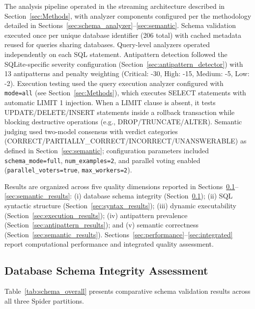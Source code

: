 \documentclass[]{einformatica}
\begin{document}
The analysis pipeline operated in the streaming architecture described in Section~\ref{sec:Methods}, with analyzer components configured per the methodology detailed in Sections~\ref{sec:schema_analyzer}--\ref{sec:semantic}. Schema validation executed once per unique database identifier (206 total) with cached metadata reused for queries sharing databases. Query-level analyzers operated independently on each SQL statement. Antipattern detection followed the SQLite-specific severity configuration (Section~\ref{sec:antipattern_detector}) with 13 antipatterns and penalty weighting (Critical: -30, High: -15, Medium: -5, Low: -2). Execution testing used the query execution analyzer configured with \texttt{mode=all} (see Section~\ref{sec:Methods}), which executes SELECT statements with automatic LIMIT 1 injection. When a LIMIT clause is absent, it tests UPDATE/DELETE/INSERT statements inside a rollback transaction while blocking destructive operations (e.g., DROP/\allowbreak TRUNCATE/\allowbreak ALTER). Semantic judging used two-model consensus with verdict categories (CORRECT/\allowbreak PARTIALLY\_CORRECT/\allowbreak INCORRECT/\allowbreak UNANSWERABLE) as defined in Section~\ref{sec:semantic}; configuration parameters included \texttt{schema\_mode=full}, \texttt{num\_examples=2}, and parallel voting enabled (\texttt{parallel\_voters=true}, \texttt{max\_workers=2}).

Results are organized across five quality dimensions reported in Sections~\ref{sec:schema_results}--\ref{sec:semantic_results}: (i) database schema integrity (Section~\ref{sec:schema_results}); (ii) SQL syntactic structure (Section~\ref{sec:syntax_results}); (iii) dynamic executability (Section~\ref{sec:execution_results}); (iv) antipattern prevalence (Section~\ref{sec:antipattern_results}); and (v) semantic correctness (Section~\ref{sec:semantic_results}). Sections~\ref{sec:performance}--\ref{sec:integrated} report computational performance and integrated quality assessment.

\subsection{Database Schema Integrity Assessment}\label{sec:schema_results}

Table~\ref{tab:schema_overall} presents comparative schema validation results across all three Spider partitions.
\end{document}
